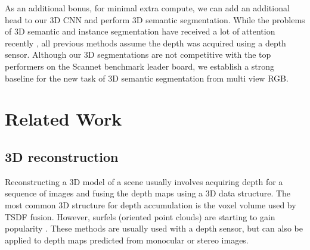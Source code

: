 \documentclass[runningheads]{llncs}
\begin{document}
As an additional bonus, for minimal extra compute, we can add an additional head to our 3D CNN and perform 3D semantic segmentation.
While the problems of 3D semantic and instance segmentation have received a lot of attention recently \cite{hou20183dsis, graham20183d},
all previous methods assume the depth was acquired using a depth sensor.
Although our 3D segmentations are not competitive with the top performers on the Scannet benchmark leader board,
we establish a strong baseline for the new task of 3D semantic segmentation from multi view RGB.







\section{Related Work}
\subsection{3D reconstruction}
Reconstructing a 3D model of a scene usually involves acquiring depth for a sequence of images and fusing the depth maps using a 3D data structure.
The most common 3D structure for depth accumulation is the voxel volume used by TSDF fusion\cite{curless1996volumetric}.
However, surfels (oriented point clouds) are starting to gain popularity \cite{whelan2015elasticfusion, schops2019surfelmeshing}.
These methods are usually used with a depth sensor, but can also be applied to depth maps predicted from monocular or stereo images.
\end{document}
